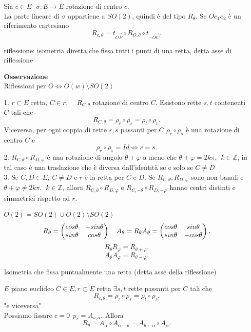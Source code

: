 \documentclass[12px]{article}
\begin{document}
Sia $c\in E\ \ \ \sigma : E \rightarrow E$  rotazione di centro $c$.\\
La parte lineare di $\sigma$ appartiene a $SO(2)$, quindi è del tipo $R_\theta$. Se $Oe_1e_2$ è un riferimento cartesiano
\[
	R_{c,\theta} = t_{\overrightarrow{OP}}\circ R_{O,\theta} \circ t_{-\overrightarrow{OC}}
.\] 
\begin{nome}
	riflessione: isometria diretta che fissa tutti i punti di una retta, detta asse di riflessione
\end{nome}
\textbf{Osservazione}\\
Riflessioni per $O  \Leftrightarrow O(w)\setminus SO(2)$
\newpage
\begin{lemm}
	1. $r\subset E$ retta, $C\in r$, \ \  $R_{C,\theta}$ rotazione di centro $C$. Esistono rette $s,t$ contenenti $C$ tali che 
	\[
		R_{C,\theta} = \rho_r\circ\rho_s=\rho_t\circ\rho_r
	.\] 
	Viceversa, per ogni coppia di rette $r,s$ passanti per $C$ $\rho_r\circ\rho_s$ è una rotazione di centro $C$ e \[\rho_r\circ\rho_s = Id \Leftrightarrow r = s.\]
	2. $R_{C,\theta}\circ R_{D,\varphi}$ è una rotazione di angolo $\theta + \varphi$ a meno che $\theta + \varphi = 2k\pi,\ \ k\in\mathbb{Z}$, in tal caso è una traslazione che è diversa dall'identità se e solo se $C\neq D$\\
	3. Se $C,D\in E, \ C\neq D$ e $r$ è la retta per $C$ e $D$. Se $R_{C,\theta}, R_{D,\varphi}$ sono non banali e $\theta + \varphi\neq 2k\pi, \ \ k\in \mathbb{Z}$, allora $R_{C,\theta}\circ R_{D,\varphi}$ e $R_{C,-\theta}\circ R_{D,-\varphi}$ hanno centri distinti e simmetrici rispetto ad $r$.
\end{lemm}
$O(2) = SO(2) \cup O(2)\setminus SO(2)$
	\[
		R_\theta = \begin{pmatrix}cos\theta & -sin\theta\\ sin\theta& cos\theta\end{pmatrix}\ \ \ A_\theta = R_\theta A_\theta = \begin{pmatrix}cos\theta& sin\theta\\ sin\theta & -cos\theta\end{pmatrix}
	.\] 
	\[
		R_\theta R_\varphi = R_{\theta + \varphi}
	.\] 
	\[
		A_\theta A_ \varphi = R_{\theta - \varphi}
	.\] 
	\begin{defi}[Riflessione]
		Isometria che fissa puntualmente una retta (detta asse della riflessione)
	\end{defi}
	$E$ piano euclideo
	$C\in E, r\subset E$ retta $\exists s,t$ rette passanti per $C$ tali che
	\[
	 R_{c,\theta} = \rho_r \circ\rho_s = \rho_t\circ\rho_r	.\] 
	"e viceversa"\\
	Possiamo fissare $c = 0 \ \ p_r = A_{o,\alpha}.$ Allora
	\[
		R_\theta = A_\alpha\circ A_{\alpha - \theta} = A_{\theta + \alpha}\circ A_\alpha
	.\] 
\end{document}
